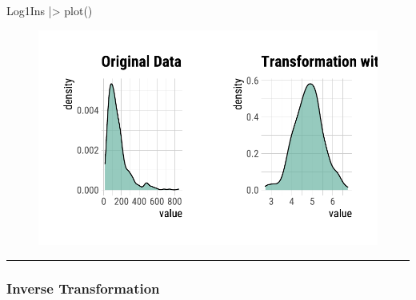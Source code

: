 \documentclass[
  letterpaper,
  DIV=11,
  numbers=noendperiod]{scrreprt}
\newenvironment{Shaded}{\begin{snugshade}}{\end{snugshade}}
\newcommand{\AttributeTok}[1]{\textcolor[rgb]{0.40,0.45,0.13}{#1}}
\newcommand{\FunctionTok}[1]{\textcolor[rgb]{0.28,0.35,0.67}{#1}}
\newcommand{\NormalTok}[1]{\textcolor[rgb]{0.00,0.23,0.31}{#1}}
\newcommand{\OtherTok}[1]{\textcolor[rgb]{0.00,0.23,0.31}{#1}}
\newcommand{\SpecialCharTok}[1]{\textcolor[rgb]{0.37,0.37,0.37}{#1}}
\newcommand{\StringTok}[1]{\textcolor[rgb]{0.13,0.47,0.30}{#1}}
\begin{document}
\begin{Shaded}
\begin{Highlighting}[]
\NormalTok{Log1Ins }\SpecialCharTok{|\textgreater{}}
  \FunctionTok{plot}\NormalTok{()}
\end{Highlighting}
\end{Shaded}

\begin{figure}[H]

{\centering \includegraphics{./TransformingLikeDataTrans_files/figure-pdf/unnamed-chunk-11-1.pdf}

}

\end{figure}

\begin{center}\rule{0.5\linewidth}{0.5pt}\end{center}

\hypertarget{inverse-transformation}{%
\subsubsection{Inverse Transformation}\label{inverse-transformation}}

\begin{Shaded}
\end{Shaded}
\end{document}
